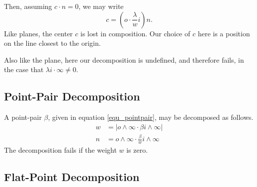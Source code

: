 \documentclass[12pt]{article}
\newcommand{\nvao}{o}
\newcommand{\nvai}{\infty}
\begin{document}
Then, assuming $c\cdot n=0$, we may write
\begin{equation}
c = \left(\nvao\cdot\frac{\lambda}{w}i\right)n.
\end{equation}
Like planes, the center $c$ is lost in composition.  Our choice
of $c$ here is a position on the line closest to the origin.

Also like the plane, here our decomposition is undefined,
and therefore fails, in the case that $\lambda i\cdot\nvai\neq 0$.

\subsection{Point-Pair Decomposition}


A point-pair $\beta$, given in equation \eqref{equ_pointpair}, may be
decomposed as follows.
\begin{align}
w &= |\nvao\wedge\nvai\cdot\beta i\wedge\nvai| \\
n &= \nvao\wedge\nvai\cdot\frac{\beta}{w} i\wedge\nvai
\end{align}
The decomposition fails if the weight $w$ is zero.

\subsection{Flat-Point Decomposition}
\end{document}
